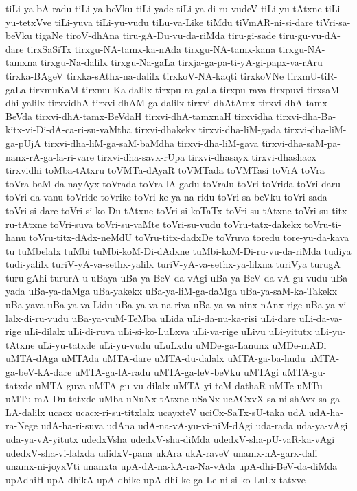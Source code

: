 {tiLi-ya-bA-radu
tiLi-ya-beVku
tiLi-yade
tiLi-ya-di-ru-vudeV
tiLi-yu-tAtxne
tiLi-yu-tetxVve
tiLi-yuva
tiLi-yu-vudu
tiLu-va-Like
tiMdu
tiVmAR-ni-si-dare
tiVri-sa-beVku
tigaNe
tiroV-dhAna
tiru-gA-Du-vu-da-riMda
tiru-gi-sade
tiru-gu-vu-dA-dare
tirxSaSiTx
tirxgu-NA-tamx-ka-nAda
tirxgu-NA-tamx-kana
tirxgu-NA-tamxna
tirxgu-Na-dalilx
tirxgu-Na-gaLa
tirxja-ga-pa-ti-yA-gi-papx-va-rAru
tirxka-BAgeV
tirxka-sAthx-na-dalilx
tirxkoV-NA-kaqti
tirxkoVNe
tirxmU-tiR-gaLa
tirxmuKaM
tirxmu-Ka-dalilx
tirxpu-ra-gaLa
tirxpu-rava
tirxpuvi
tirxsaM-dhi-yalilx
tirxvidhA
tirxvi-dhAM-ga-dalilx
tirxvi-dhAtAmx
tirxvi-dhA-tamx-BeVda
tirxvi-dhA-tamx-BeVdaH
tirxvi-dhA-tamxnaH
tirxvidha
tirxvi-dha-Ba-kitx-vi-Di-dA-ca-ri-su-vaMtha
tirxvi-dhakekx
tirxvi-dha-liM-gada
tirxvi-dha-liM-ga-pUjA
tirxvi-dha-liM-ga-saM-baMdha
tirxvi-dha-liM-gava
tirxvi-dha-saM-pa-nanx-rA-ga-la-ri-vare
tirxvi-dha-savx-rUpa
tirxvi-dhasayx
tirxvi-dhashacx
tirxvidhi
toMba-tAtxru
toVMTa-dAyaR
toVMTada
toVMTasi
toVrA
toVra
toVra-baM-da-nayAyx
toVrada
toVra-lA-gadu
toVralu
toVri
toVrida
toVri-daru
toVri-da-vanu
toVride
toVrike
toVri-ke-ya-na-ridu
toVri-sa-beVku
toVri-sada
toVri-si-dare
toVri-si-ko-Du-tAtxne
toVri-si-koTaTx
toVri-su-tAtxne
toVri-su-titx-ru-tAtxne
toVri-suva
toVri-su-vaMte
toVri-su-vudu
toVru-tatx-dakekx
toVru-ti-hanu
toVru-titx-dAdx-neMdU
toVru-titx-dadxDe
toVruva
toredu
tore-yu-da-kava
tu
tuMbelalx
tuMbi
tuMbi-koM-Di-dAdxne
tuMbi-koM-Di-ru-vu-da-riMda
tudiya
tudi-yalilx
turiV-yA-va-sethx-yalilx
turiV-yA-va-sethx-ya-lilxna
turiVya
turugA
turu-gAhi
tururA
u
uBaya
uBa-ya-BeV-da-vAgi
uBa-ya-BeV-da-vA-gu-vudu
uBa-yada
uBa-ya-daMga
uBa-yakekx
uBa-ya-liM-ga-daMga
uBa-ya-saM-ka-Takekx
uBa-yava
uBa-ya-va-Lidu
uBa-ya-va-na-riva
uBa-ya-va-ninx-nAnx-rige
uBa-ya-vi-lalx-di-ru-vudu
uBa-ya-vuM-TeMba
uLida
uLi-da-nu-ka-risi
uLi-dare
uLi-da-va-rige
uLi-dilalx
uLi-di-ruva
uLi-si-ko-LuLxva
uLi-va-rige
uLivu
uLi-yitutx
uLi-yu-tAtxne
uLi-yu-tatxde
uLi-yu-vudu
uLuLxdu
uMDe-ga-Lanunx
uMDe-mADi
uMTA-dAga
uMTAda
uMTA-dare
uMTA-du-dalalx
uMTA-ga-ba-hudu
uMTA-ga-beV-kA-dare
uMTA-ga-lA-radu
uMTA-ga-leV-beVku
uMTAgi
uMTA-gu-tatxde
uMTA-guva
uMTA-gu-vu-dilalx
uMTA-yi-teM-dathaR
uMTe
uMTu
uMTu-mA-Du-tatxde
uMba
uNuNx-tAtxne
uSaNx
ucACxvX-sa-ni-shAvx-sa-ga-LA-dalilx
ucacx
ucacx-ri-su-titxlalx
ucayxteV
uciCx-SaTx-sU-taka
udA
udA-ha-ra-Nege
udA-ha-ri-suva
udAna
udA-na-vA-yu-vi-niM-dAgi
uda-rada
uda-ya-vAgi
uda-ya-vA-yitutx
udedxVsha
udedxV-sha-diMda
udedxV-sha-pU-vaR-ka-vAgi
udedxV-sha-vi-lalxda
udidxV-pana
ukAra
ukA-raveV
unamx-nA-garx-dali
unamx-ni-joyxVti
unanxta
upA-dA-na-kA-ra-Na-vAda
upA-dhi-BeV-da-diMda
upAdhiH
upA-dhikA
upA-dhike
upA-dhi-ke-ga-Le-ni-si-ko-LuLx-tatxve
}
